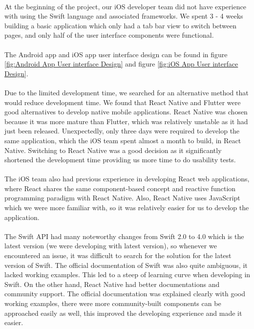 \documentclass[12pt,a4paper]{article}
\begin{document}
        \paragraph{} At the beginning of the project, our iOS developer team did not have experience with using the Swift language and associated frameworks. We spent 3 - 4 weeks building a basic application which only had a tab bar view to switch between pages, and only half of the user interface components were functional. 

        \paragraph{} The Android app and iOS app user interface design can be found in figure \ref{fig:Android App User interface Design} and figure \ref{fig:iOS App User interface Design}.
        
        \paragraph{} Due to the limited development time, we searched for an alternative method that would reduce development time. We found that React Native and Flutter were good alternatives to develop native mobile applications. React Native was chosen because it was more mature than Flutter, which was relatively unstable as it had just been released. Unexpectedly, only three days were required to develop the same application, which the iOS team spent almost a month to build, in React Native. Switching to React Native was a good decision as it significantly shortened the development time providing us more time to do usability tests.
        
        \paragraph{} The iOS team also had previous experience in developing React web applications, where React shares the same component-based concept and reactive function programming paradigm with React Native. Also, React Native uses JavaScript which we were more familiar with, so it was relatively easier for us to develop the application.
        
        \paragraph{} The Swift API had many noteworthy changes from Swift 2.0 to 4.0 which is the latest version (we were developing with latest version), so whenever we encountered an issue, it was difficult to search for the solution for the latest version of Swift. The official documentation of Swift was also quite ambiguous, it lacked working examples. This led to a steep of learning curve when developing in Swift. On the other hand, React Native had better documentations and community support. The official documentation was explained clearly with good working examples, there were more community-built components can be approached easily as well, this improved the developing experience and made it easier.
        
\end{document}
